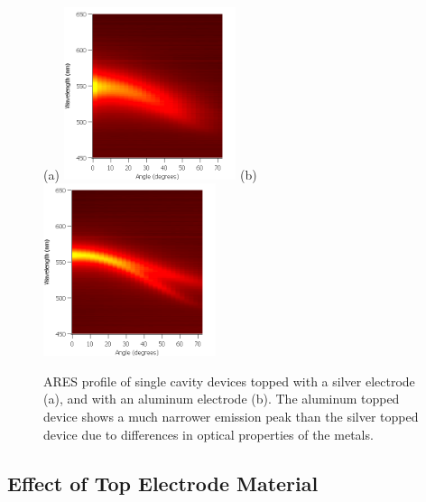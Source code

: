 \documentclass{report}
\begin{document}
        
        \begin{figure}[h!]
            \centering
            (a)
            \includegraphics[width=0.45\textwidth]{images/n1_ag_top_heatmap.png}
            (b)
            \includegraphics[width=0.45\textwidth]{images/n1_al_top_heatmap.png}
            \caption{\small ARES profile of single cavity devices topped with a silver electrode (a), and with an aluminum electrode (b). The aluminum topped device shows a much narrower emission peak than the silver topped device due to differences in optical properties of the metals.}
            \label{fig:topMaterial}
        \end{figure}
        \subsection{Effect of Top Electrode Material} \label{topMaterial}
\end{document}
